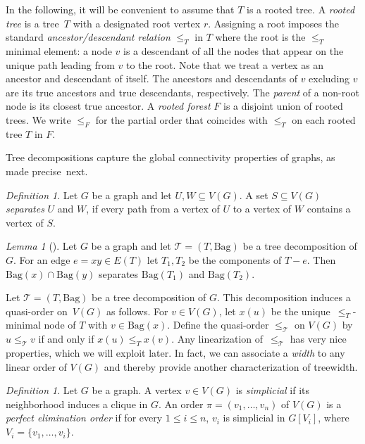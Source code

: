 \documentclass[1p,number,a4paper]{elsarticle}
\theoremstyle{remark}
\newcommand{\Tt}{\mathcal{T}}
\newcommand{\bag}{\mathrm{Bag}}
\newtheorem{definition}[theorem]{Definition}
\newtheorem{lemma}[theorem]{Lemma}
\begin{document}
  In the following, it will be convenient to assume that $T$ is a rooted tree. A \emph{rooted tree} is a tree~$T$ with a designated root vertex $r$. Assigning a root imposes the 
  standard \emph{ancestor/descendant
  relation} $\leq_T$ in $T$ where the root is the $\leq_T$ minimal element: 
  a node $v$ is a descendant of all the nodes that appear on the unique 
  path leading from $v$ to the root. Note that we treat a vertex as an 
  ancestor and descendant of itself. The ancestors and descendants of 
  $v$ excluding $v$ are its true ancestors and true descendants, respectively. 
  The \emph{parent} 
  of a non-root node is its closest true ancestor. 
  A \emph{rooted forest} $F$ is a disjoint union of rooted trees. We write
  $\leq_F$ for the partial order that coincides with $\leq_T$ on each rooted
  tree $T$ in $F$. 

  
  \smallskip
  Tree decompositions capture the global connectivity properties of 
  graphs, as made precise~next. 
  
  \begin{definition}
  Let $G$ be a graph and let $U,W\subseteq V(G)$. A set $S\subseteq V(G)$ \emph{separates}
  $U$ and $W$, if every path from a vertex of $U$ to a vertex of $W$
  contains a vertex of $S$. 
  \end{definition}
  
  \begin{lemma}[\cite{RobertsonS86}]\label{lem:sep}
  Let $G$ be a graph and let $\Tt=(T,\bag)$ be a tree decomposition
  of $G$. 
  For an edge $e=xy\in E(T)$ let $T_1,T_2$ be the components of $T-e$. 
  Then $\bag(x)\cap \bag(y)$ separates $\bag(T_1)$ and $\bag(T_2)$.
  \end{lemma}
  

Let $\Tt=(T,\bag)$ be a tree decomposition of $G$. This decomposition induces a quasi-order on~$V(G)$ as follows. 
For $v\in V(G)$, let $x(u)$ be the unique~$\leq_T$-minimal node of $T$ with $v\in \bag(x)$. 
Define the quasi-order $\leq_{\Tt}$ on $V(G)$ by $u\leq_{\Tt} v$ if and only if $x(u)\leq_T x(v)$. Any linearization of~$\leq_\Tt$ has very nice properties, which we will exploit later. In fact, we can associate a \emph{width} to any linear order of $V(G)$ and thereby provide another characterization of treewidth. 

\begin{definition}\label{def:elimination-order}
Let $G$ be a graph. A vertex $v\in V(G)$ is \emph{simplicial}
if its neighborhood induces a clique in $G$. An order
$\pi=(v_1,\ldots, v_n)$ of $V(G)$ is a \emph{perfect elimination
order} if for every $1\leq i\leq n$, $v_i$ is simplicial in 
$G[V_{i}]$, where $V_{i}=\{v_1,\ldots, v_{i}\}$. 
\end{definition}
\end{document}
